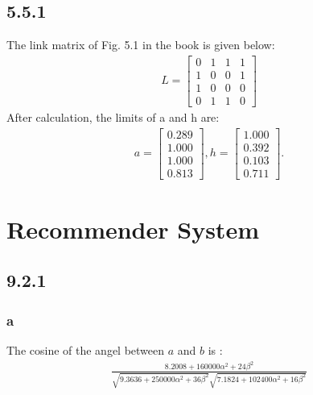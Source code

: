 \documentclass[paper=a4, fontsize=15pt]{article} %
\begin{document}
\subsection*{5.5.1}
The link matrix of Fig. 5.1 in the book is given below:\\
\begin{align}
L = 
\begin{bmatrix}
       0 & 1 & 1  & 1   \\[0.3em]
       1  & 0 & 0 & 1	\\[0.3em]
	   1  & 0 & 0 & 0	\\[0.3em]
       0 & 1 & 1  & 0
\end{bmatrix}
\end{align}
After calculation, the limits of a and h are: 
\begin{align}
a = 
\begin{bmatrix}
       0.289    \\[0.3em]
       1.000 	\\[0.3em]
	   1.000 	\\[0.3em]
       0.813
\end{bmatrix},
h=
\begin{bmatrix}
       1.000    \\[0.3em]
       0.392 	\\[0.3em]
	   0.103 	\\[0.3em]
       0.711
\end{bmatrix}.
\end{align}





\section*{Recommender System}
\subsection*{9.2.1}
\subsubsection*{a}
The cosine of the angel between $a$ and $b$ is :\\
\begin{align}
\frac{8.2008 + 160000\alpha^2 + 24\beta^2}
{\sqrt{9.3636 + 250000\alpha^2 + 36\beta^2} \sqrt{7.1824 + 102400\alpha^2 + 16\beta^2}}
\end{align}
\end{document}
